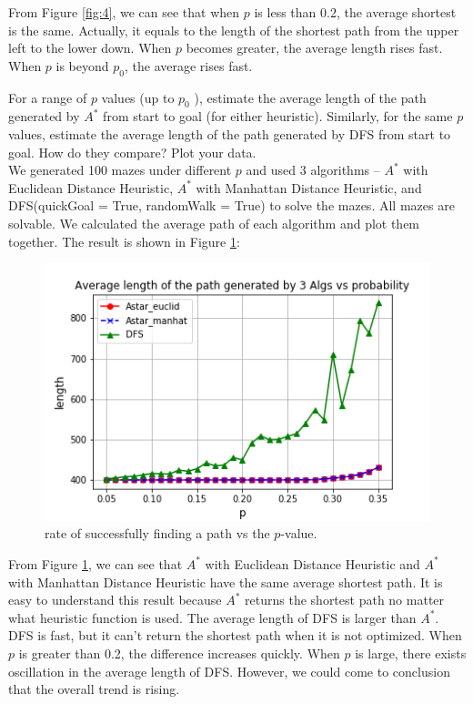 \documentclass[letter]{article}
\begin{document}
\begin{questions}
	From Figure \ref{fig:4}, we can see that when $ p $ is less than 0.2, the average shortest is the same. Actually, it equals to the length of the shortest path from the upper left to the lower down. When $ p $ becomes greater, the average length rises fast. When $ p $ is beyond $ p_0 $, the average rises fast. \\
	
	\item {For a range of $ p $ values (up to $ p_0 $ ), estimate the average length of the path generated by $ A^* $ from start to goal (for either heuristic). Similarly, for the same $ p $ values, estimate the average length of the path generated by DFS from start to goal. How do they compare? Plot your data.} \\
	
	We generated 100 mazes under different $ p $ and used 3 algorithms -- $ A^* $ with Euclidean Distance Heuristic, $ A^* $ with Manhattan Distance Heuristic, and DFS(quickGoal = True, randomWalk = True) to solve the mazes. All mazes are solvable. We calculated the average path of each algorithm and plot them together. The result is shown in Figure \ref{fig:5}: \\
	
	\begin{figure}
		\centering
		\includegraphics[width=\textwidth]{../pics/question5.png}
		\caption{\label{fig:5}rate of successfully finding a path vs the $ p $-value.}
	\end{figure}
	
	From Figure \ref{fig:5}, we can see that $ A^* $ with Euclidean Distance Heuristic and $ A^* $ with Manhattan Distance Heuristic have the same average shortest path. It is easy to understand this result because $ A^* $ returns the shortest path no matter what heuristic function is used. The average length of DFS is larger than $ A^* $. DFS is fast, but it can’t return the shortest path when it is not optimized. When $ p $ is greater than 0.2, the difference increases quickly. When $ p $ is large, there exists oscillation in the average length of DFS. However, we could come to conclusion that the overall trend is rising. \\
	

\end{questions}
\end{document}
